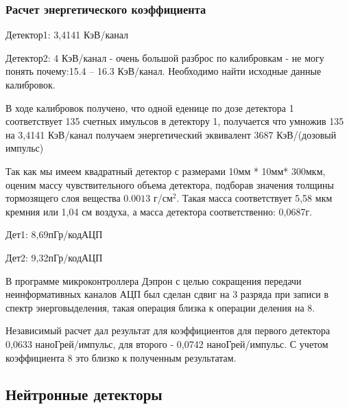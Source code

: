 


\subsubsection{Расчет энергетического коэффициента}
Детектор1: 3,4141 КэВ/канал 

Детектор2: 4 КэВ/канал - очень большой разброс по калибровкам - не могу понять почему:15.4 – 16.3 КэВ/канал. Необходимо найти исходные данные калибровок.

В ходе калибровок получено, что одной еденице по дозе детектора 1 соответствует 135 счетных имульсов в детектору 1, получается что умножив 135 на 3,4141  КэВ/канал  получаем энергетический эквивалент 3687 КэВ/(дозовый импульс) 

Так как мы имеем квадратный детектор с размерами 10мм * 10мм* 300мкм, оценим массу чувствительного объема детектора, подборав значения толщины тормозящего слоя вещества $ 0.0013 $ г/см$^2 $. Такая масса соответствует 5,58 мкм кремния или 1,04 см воздуха, а масса детектора соответственно: 0,0687г.

Дет1: 8,69пГр/кодАЦП 

Дет2: 9,32пГр/кодАЦП  


В программе микроконтроллера Дэпрон с целью сокращения передачи неинформативных каналов АЦП был сделан сдвиг на 3 разряда при записи в спектр энерговыделения, такая операция близка к операции деления на 8.

Независимый расчет дал результат для коэффициентов для первого детектора 0,0633  наноГрей/импульс, для второго -  0,0742 наноГрей/импульс. С учетом коэффициента 8 это близко к полученным результатам.

\subsection{Нейтронные детекторы}

